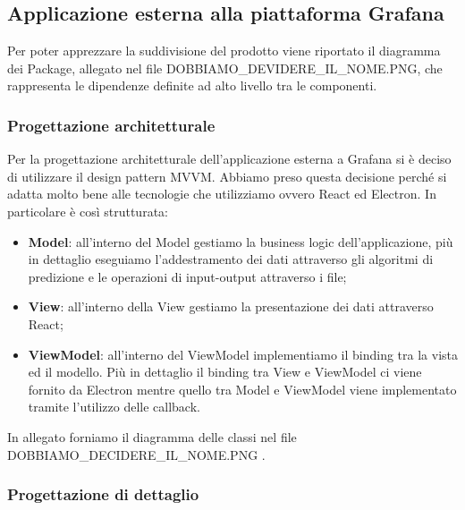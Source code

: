 	\subsection{Applicazione esterna alla piattaforma Grafana}
	Per poter apprezzare la suddivisione del prodotto viene riportato il diagramma dei Package, allegato nel file DOBBIAMO_DEVIDERE_IL_NOME.PNG, che rappresenta le dipendenze definite ad alto livello tra le componenti.
		\subsubsection{Progettazione architetturale}
			Per la progettazione architetturale dell'applicazione esterna a Grafana si è deciso di utilizzare il design pattern MVVM. Abbiamo preso questa decisione perché si adatta molto bene alle tecnologie che utilizziamo ovvero React ed Electron. In particolare è così strutturata:
		\begin{itemize}
			\item \textbf{Model}: all'interno del Model gestiamo la business logic dell'applicazione, più in dettaglio eseguiamo l'addestramento dei dati attraverso gli algoritmi di predizione e le operazioni di input-output attraverso i file;
			\item \textbf{View}: all'interno della View gestiamo la presentazione dei dati attraverso React;
			\item \textbf{ViewModel}: all'interno del ViewModel implementiamo il binding tra la vista ed il modello. Più in dettaglio il binding tra View e ViewModel ci viene fornito da Electron mentre quello tra Model e ViewModel viene implementato tramite l'utilizzo delle callback.
		\end{itemize}
		In allegato forniamo il diagramma delle classi nel file DOBBIAMO_DECIDERE_IL_NOME.PNG .
		\subsubsection{Progettazione di dettaglio}
